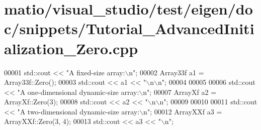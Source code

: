 \hypertarget{matio_2visual__studio_2test_2eigen_2doc_2snippets_2_tutorial___advanced_initialization___zero_8cpp_source}{}\section{matio/visual\+\_\+studio/test/eigen/doc/snippets/\+Tutorial\+\_\+\+Advanced\+Initialization\+\_\+\+Zero.cpp}
\label{matio_2visual__studio_2test_2eigen_2doc_2snippets_2_tutorial___advanced_initialization___zero_8cpp_source}

\begin{DoxyCode}
00001 std::cout << \textcolor{stringliteral}{"A fixed-size array:\(\backslash\)n"};
00002 Array33f a1 = Array33f::Zero();
00003 std::cout << a1 << \textcolor{stringliteral}{"\(\backslash\)n\(\backslash\)n"};
00004 
00005 
00006 std::cout << \textcolor{stringliteral}{"A one-dimensional dynamic-size array:\(\backslash\)n"};
00007 ArrayXf a2 = ArrayXf::Zero(3);
00008 std::cout << a2 << \textcolor{stringliteral}{"\(\backslash\)n\(\backslash\)n"};
00009 
00010 
00011 std::cout << \textcolor{stringliteral}{"A two-dimensional dynamic-size array:\(\backslash\)n"};
00012 ArrayXXf a3 = ArrayXXf::Zero(3, 4);
00013 std::cout << a3 << \textcolor{stringliteral}{"\(\backslash\)n"};
\end{DoxyCode}
